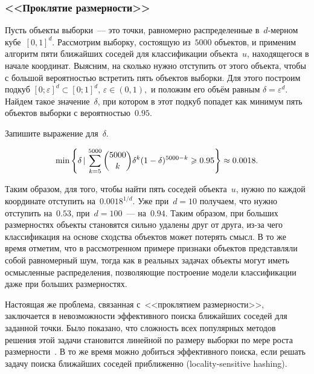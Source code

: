 \documentclass[12pt,fleqn]{article}
\begin{document}
        \subsubsection{<<Проклятие размерности>>}
        Пусть объекты выборки~--- это точки, равномерно распределенные в~$d$-мерном кубе~$[0, 1]^d$.
        Рассмотрим выборку, состоящую из~$5000$ объектов, и применим алгоритм
        пяти ближайших соседей для классификации объекта~$u$, находящегося в начале координат.
        Выясним, на сколько нужно отступить от этого объекта, чтобы с большой вероятностью встретить
        пять объектов выборки.
        Для этого построим подкуб $[0; \varepsilon]^d \subset [0; 1]^d, \, \varepsilon \in (0, 1),$ и положим его объём равным $\delta = \varepsilon^d.$ Найдем такое значение~$\delta$,
        при котором в этот подкуб попадет как минимум пять объектов выборки
        с вероятностью~$0.95$.
        \begin{vkProblem}
            Запишите выражение для~$\delta$.
        \end{vkProblem}
        \begin{esSolution}
            \[
                \min \left\{\delta \mspace{3mu}{|}\mspace{3mu}
                    \sum_{k = 5}^{5000} \binom{5000}{k} \delta^k (1 - \delta)^{5000 - k}
                    \geqslant
                    0.95 \right\} \approx 0.0018.
            \]
        \end{esSolution}
        
        Таким образом, для того, чтобы найти пять соседей объекта~$u$,
        нужно по каждой координате отступить на~$0.0018^{1/d}$.
        Уже при~$d = 10$ получаем, что нужно отступить на~$0.53$,
        при~$d = 100$~--- на~$0.94$.
        Таким образом, при больших размерностях объекты становятся сильно удалены друг от друга,
        из-за чего классификация на основе сходства объектов может потерять смысл.
        В то же время отметим, что в рассмотренном примере признаки объектов представляли собой равномерный шум,
        тогда как в реальных задачах объекты могут иметь осмысленные распределения, позволяющие
        построение модели классификации даже при больших размерностях.

        Настоящая же проблема, связанная с~<<проклятием размерности>>,
        заключается в невозможности эффективного поиска ближайших соседей для
        заданной точки.
        Было показано, что сложность всех популярных методов решения этой задачи
        становится линейной по размеру выборки по мере роста размерности~\cite{weber98similarity}.
        В то же время можно добиться эффективного поиска,
        если решать задачу поиска ближайших соседей приближенно (locality-sensitive hashing).
\end{document}
